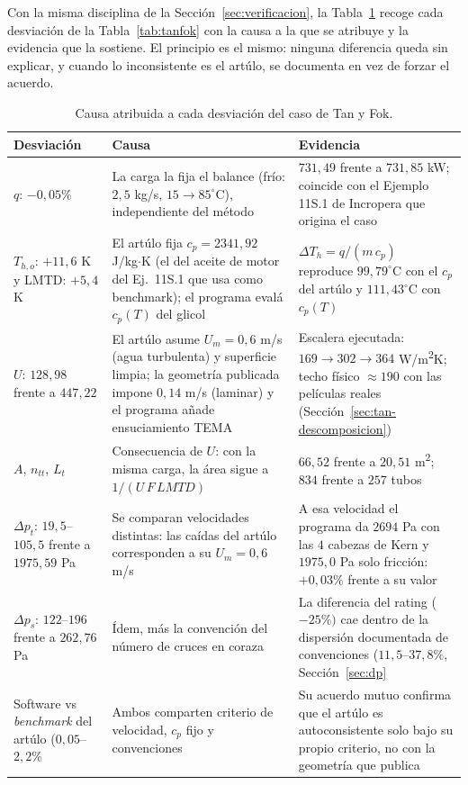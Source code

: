 \documentclass[11pt,a4paper]{article}
\begin{document}
Con la misma disciplina de la Secci\'on~\ref{sec:verificacion}, la
Tabla~\ref{tab:tan-causas} recoge cada desviaci\'on de la
Tabla~\ref{tab:tanfok} con la causa a la que se atribuye y la evidencia
que la sostiene. El principio es el mismo: ninguna diferencia queda sin
explicar, y cuando lo inconsistente es el art\'ulo, se documenta en vez
de forzar el acuerdo.

\begin{table}[H]
\centering
\caption{Causa atribuida a cada desviaci\'on del caso de Tan y Fok.}
\label{tab:tan-causas}
\footnotesize
\setlength{\tabcolsep}{4pt}
\begin{tabular}{@{}p{3.6cm}p{4.4cm}p{5.0cm}@{}}
\toprule
\textbf{Desviaci\'on} & \textbf{Causa} & \textbf{Evidencia} \\
\midrule
$q$: $-0{,}05\%$ & La carga la fija el balance (fr\'io:
$2{,}5$ kg/s, $15\rightarrow 85^\circ$C), independiente del m\'etodo
& $731{,}49$ frente a $731{,}85$ kW; coincide con el Ejemplo 11S.1 de
Incropera que origina el caso \\
$T_{h,o}$: $+11{,}6$ K y LMTD: $+5{,}4$ K & El art\'ulo fija
$c_p = 2341{,}92$ J/kg$\cdot$K (el del aceite de motor del Ej.~11S.1
que usa como benchmark); el programa eval\'a $c_p(T)$ del glicol &
$\Delta T_h = q/(m\,c_p)$ reproduce $99{,}79^\circ$C con el
$c_p$ del art\'ulo y $111{,}43^\circ$C con $c_p(T)$ \\
$U$: $128{,}98$ frente a $447{,}22$ & El art\'ulo asume $U_m = 0{,}6$
m/s (agua turbulenta) y superficie limpia; la geometr\'ia publicada
impone $0{,}14$ m/s (laminar) y el programa a\~nade ensuciamiento TEMA &
Escalera ejecutada: $169\rightarrow 302\rightarrow 364$
W/m\textsuperscript{2}K; techo f\'isico $\approx 190$ con las
pel\'iculas reales (Secci\'on~\ref{sec:tan-descomposicion}) \\
$A$, $n_{tt}$, $L_t$ & Consecuencia de $U$: con la misma carga, la
\'area sigue a $1/(U\,F\,LMTD)$ & $66{,}52$ frente a
$20{,}51$ m\textsuperscript{2}; $834$ frente a $257$ tubos \\
$\Delta p_t$: $19{,}5$--$105{,}5$ frente a $1975{,}59$ Pa & Se comparan
velocidades distintas: las ca\'idas del art\'ulo corresponden a su
$U_m = 0{,}6$ m/s & A esa velocidad el programa da $2694$ Pa con las
$4$ cabezas de Kern y $1975{,}0$ Pa solo fricci\'on: $+0{,}03\%$
frente a su valor \\
$\Delta p_s$: $122$--$196$ frente a $262{,}76$ Pa & \'Idem, m\'as la
convenci\'on del n\'umero de cruces en coraza & La diferencia del
rating ($-25\%)$ cae dentro de la dispersi\'on documentada de
convenciones ($11{,}5$--$37{,}8\%$, Secci\'on~\ref{sec:dp} \\
Software vs \emph{benchmark} del art\'ulo ($0{,}05$--$2{,}2\%$
& Ambos comparten criterio de velocidad, $c_p$ fijo y convenciones &
Su acuerdo mutuo confirma que el art\'ulo es autoconsistente solo bajo
su propio criterio, no con la geometr\'ia que publica \\
\bottomrule
\end{tabular}
\end{table}
\end{document}

